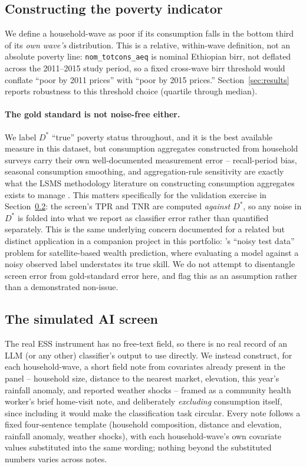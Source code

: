 \documentclass[12pt]{article}
\begin{document}
\subsection{Constructing the poverty indicator}

We define a household-wave as poor if its consumption falls in the bottom third of its \emph{own wave's} distribution. This is a relative, within-wave definition, not an absolute poverty line: \texttt{nom\_totcons\_aeq} is nominal Ethiopian birr, not deflated across the 2011--2015 study period, so a fixed cross-wave birr threshold would conflate ``poor by 2011 prices'' with ``poor by 2015 prices.'' Section~\ref{sec:results} reports robustness to this threshold choice (quartile through median).

\paragraph{The gold standard is not noise-free either.} We label $D^{*}$ ``true'' poverty status throughout, and it is the best available measure in this dataset, but consumption aggregates constructed from household surveys carry their own well-documented measurement error -- recall-period bias, seasonal consumption smoothing, and aggregation-rule sensitivity are exactly what the LSMS methodology literature on constructing consumption aggregates exists to manage \citep{deaton2002guidelines}. This matters specifically for the validation exercise in Section~\ref{sec:screen}: the screen's TPR and TNR are computed \emph{against $D^{*}$}, so any noise in $D^{*}$ is folded into what we report as classifier error rather than quantified separately. This is the same underlying concern documented for a related but distinct application in a companion project in this portfolio: \citet{burke2021using}'s ``noisy test data'' problem for satellite-based wealth prediction, where evaluating a model against a noisy observed label understates its true skill. We do not attempt to disentangle screen error from gold-standard error here, and flag this as an assumption rather than a demonstrated non-issue.

\subsection{The simulated AI screen}
\label{sec:screen}

The real ESS instrument has no free-text field, so there is no real record of an LLM (or any other) classifier's output to use directly. We instead construct, for each household-wave, a short field note from covariates already present in the panel -- household size, distance to the nearest market, elevation, this year's rainfall anomaly, and reported weather shocks -- framed as a community health worker's brief home-visit note, and deliberately \emph{excluding} consumption itself, since including it would make the classification task circular. Every note follows a fixed four-sentence template (household composition, distance and elevation, rainfall anomaly, weather shocks), with each household-wave's own covariate values substituted into the same wording; nothing beyond the substituted numbers varies across notes.
\end{document}
